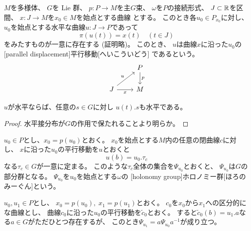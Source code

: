 \documentclass[report]{jlreq}
\begin{document}
\begin{definition}[平行移動]
    $M$を多様体、
    $G$を Lie 群、
    $p \colon P \to M$を主$G$束、
    $\omega$を$P$の接続形式、
    $J \subset \mathbb{R}$を区間、
    $x \colon J \to M$を$x_0 \in M$を始点とする{\smooth}曲線
    とする。
    このとき各$u_0 \in P_{x_0}$に対し、
    $u_0$を始点とする水平な{\smooth}曲線$u \colon J \to P$であって
    \begin{equation}
        \pi(u(t)) = x(t) \quad (t \in J)
    \end{equation}
    をみたすものが一意に存在する (証明略)。
    このとき、
    $u$は曲線$x$に沿った$u_0$の
    [parallel displacement]{平行移動}[へいこういどう]
    であるという。
    \begin{equation}
        \begin{tikzcd}
            & P \ar{d}{p} \\
            J \ar{ru}{u} \ar{r}[swap]{x}
                & M
        \end{tikzcd}
    \end{equation}
\end{definition}

\begin{proposition}
    $u$が水平ならば、任意の$s \in G$に対し
    $u(t) . s$も水平である。
\end{proposition}

\begin{proof}
    水平接分布が$G$の作用で保たれることより明らか。
\end{proof}

\begin{definition}[主ファイバー束の接続のホロノミー群]
    $u_0 \in P$とし、$x_0 = p(u_0)$とおく。
    $x_0$を始点とする$M$内の任意の閉曲線$c$に対し、
    $x$に沿った$u_0$の平行移動を$u$とおくと
    \begin{equation}
        u(b) = u_0 . \tau_c
    \end{equation}
    なる$\tau_c \in G$が一意に定まる。
    このような$\tau_c$全体の集合を$\Psi_{u_0}$とおくと、
    $\Psi_{u_0}$は$G$の部分群となる。
    $\Psi_{u_0}$を$u_0$を始点とする$\omega$の
    [holonomy group]{ホロノミー群}[ほろのみーぐん]という。
\end{definition}

\begin{proposition}[ホロノミー群の共役]
    $u_0, u_1 \in P$とし、
    $x_0 = p(u_0), \; x_1 = p(u_1)$とおく。
    $c_0$を$x_0$から$x_1$への区分的に{\smooth}な曲線とし、
    曲線$c_0$に沿った$u_0$の平行移動を$\widetilde{c}_0$とおく。
    すると$\widetilde{c}_0(b) = u_1 . a$なる$a \in G$がただひとつ存在するが、
    このとき$\Psi_{u_1} = a \Psi_{u_0} a^{-1}$が成り立つ。
\end{proposition}
\end{document}
